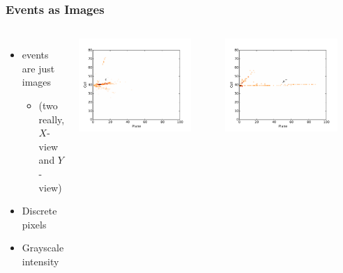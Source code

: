 \documentclass[10pt,professionalfonts,xcolor=table]{beamer}
\begin{document}
\begin{frame}
\frametitle{\nova Events as Images}

\begin{columns}[b]

\centering
\begin{itemize}
\item \nova events are just images
  \begin{itemize}
  \item[] (two really, $X$-view and $Y$-view)
  \end{itemize}
\gap
\item Discrete pixels
\gap
\item Grayscale intensity
\end{itemize}
\vspace{20pt}
\includegraphics[width=0.85\textwidth]{figures/cnn/view_truetype6_caltype6_event155_x.pdf}


\centering
\includegraphics[width=0.85\textwidth]{figures/cnn/view_truetype2_caltype2_event274_x.pdf}


\end{columns}
\end{frame}
\end{document}
